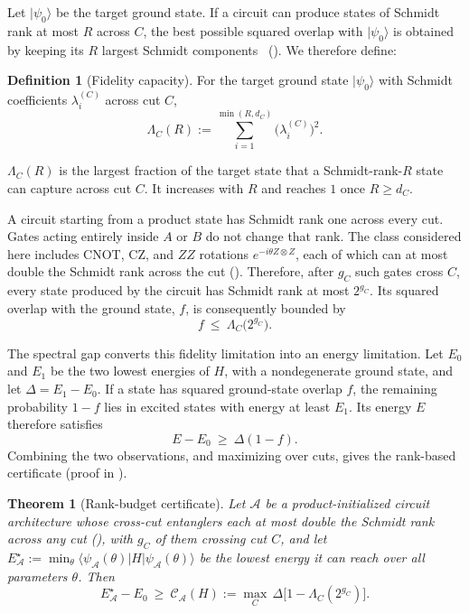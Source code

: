 \documentclass[reprint,aps,pra,floatfix,superscriptaddress,nofootinbib,longbibliography]{revtex4-2}
\newtheorem{theorem}{Theorem}
\theoremstyle{remark}
\theoremstyle{definition}
\newtheorem{definition}{Definition}
\newcommand{\calA}{\mathcal{A}}
\newcommand{\calC}{\mathcal{C}}
\newcommand{\ket}[1]{\lvert #1 \rangle}
\newcommand{\bra}[1]{\langle #1 \rvert}
\newcommand{\Estar}{E_{\calA}^{\star}}
\begin{document}
Let $\ket{\psi_0}$ be the target ground state. If a circuit can
produce states of Schmidt rank at most $R$ across $C$, the best possible squared
overlap with $\ket{\psi_0}$ is obtained by keeping its $R$ largest Schmidt
components~\cite{eckart1936approximation} (). We therefore
define:

\begin{definition}[Fidelity capacity]
\label{def:lambda}
For the target ground state $\ket{\psi_0}$ with Schmidt coefficients
$\lambda_i^{(C)}$ across cut $C$,
\begin{equation}
  \label{eq:lambda}
  \Lambda_C(R):=\sum_{i=1}^{\min(R,d_C)}\bigl(\lambda_i^{(C)}\bigr)^2 .
\end{equation}
\end{definition}

$\Lambda_C(R)$ is the largest fraction of the target state that a
Schmidt-rank-$R$ state can capture across cut $C$. It increases with $R$ and
reaches $1$ once $R\ge d_C$.

A circuit starting from a product state has Schmidt rank one across every cut.
Gates acting entirely inside $A$ or $B$ do not change that rank. The class considered here includes CNOT, CZ, and $ZZ$ rotations
$e^{-i\theta Z\otimes Z}$, each of which can at most double the Schmidt rank
across the cut (). Therefore, after $g_C$ such gates cross $C$, every state produced
by the circuit has Schmidt rank at most $2^{g_C}$. Its squared overlap with the
ground state, $f$, is consequently bounded by
\begin{equation}
  f\ \le\ \Lambda_C\bigl(2^{g_C}\bigr).
\end{equation}

The spectral gap converts this fidelity limitation into an energy limitation. Let
$E_0$ and $E_1$ be the two lowest energies of $H$, with a nondegenerate ground
state, and let $\Delta=E_1-E_0$. If a state has squared ground-state overlap $f$,
the remaining probability $1-f$ lies in excited states with energy at least
$E_1$. Its energy $E$ therefore satisfies
\begin{equation}
  E-E_0\ \ge\ \Delta(1-f).
\end{equation}
Combining the two observations, and maximizing over cuts, gives the rank-based
certificate (proof in ).

\begin{theorem}[Rank-budget certificate]
\label{thm:main}
Let $\calA$ be a product-initialized circuit architecture whose cross-cut
entanglers each at most double the Schmidt rank across any cut (),
with $g_C$ of them crossing cut $C$, and let
$\Estar:=\min_\theta\bra{\psi_\calA(\theta)}H\ket{\psi_\calA(\theta)}$ be the
lowest energy it can reach over all parameters $\theta$. Then
\begin{equation}
  \label{eq:multi}
  \boxed{\;
  \Estar - E_0 \ \ge\ \calC_{\calA}(H)
  :=\max_C\,\Delta\bigl[1-\Lambda_C(2^{g_C})\bigr].
  \;}
\end{equation}
\end{theorem}
\end{document}

